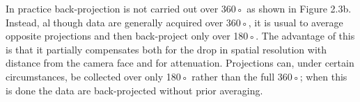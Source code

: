 \documentclass[12pt]{article}
\begin{document}
In practice back-projection is not carried out over 360◦ as shown in Figure 2.3b. Instead, although data are generally acquired over 360◦, it is usual to average opposite projections and then back-project only over 180◦. The advantage of
this is that it partially compensates both for the drop in spatial resolution with distance from the camera face and for attenuation. Projections can, under certain circumstances, be collected over only 180◦ rather than the full 360◦; when this is done the data are back-projected without prior
averaging.
\end{document}
